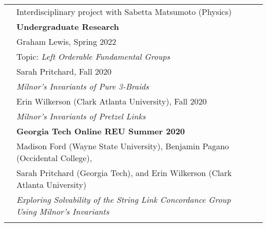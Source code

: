 \documentclass[letterpaper,11pt,oneside]{article}
\begin{document}
\begin{tabular}{@{} l l l}
    
     & Interdisciplinary project with Sabetta Matsumoto (Physics) \\
     & \textbf{Undergraduate Research} \\
     & Graham Lewis, Spring 2022\\
           & Topic: \textit{Left Orderable Fundamental Groups}\\
     &  Sarah Pritchard, Fall 2020\\
         & \textit{Milnor's Invariants of Pure 3-Braids}\\
     & Erin Wilkerson (Clark Atlanta University), Fall 2020\\
       & \textit{Milnor's Invariants of Pretzel Links}
     \\
      
   
     &\textbf{Georgia Tech Online REU Summer 2020} \\
     &   Madison Ford (Wayne State University), Benjamin Pagano (Occidental College),  \\ & Sarah Pritchard (Georgia Tech), and Erin Wilkerson (Clark Atlanta University) \\
     & \textit{Exploring Solvability of the String Link Concordance Group Using Milnor's Invariants}
         
         \\
         & \\
           \end{tabular}
\end{document}
